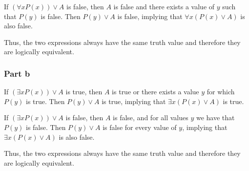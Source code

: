 \documentclass[12pt]{article}
\begin{document}
If $(\forall x P(x)) \lor A$ is false, then $A$ is false and there exists a value 
of $y$ such that $P(y)$ is false. Then $P(y) \lor A$ is false, implying that
$\forall x (P(x) \lor A)$ is also false.

Thus, the two expressions always have the same truth value and therefore they are 
logically equivalent.

\subsubsection*{Part b}

If $(\exists x P(x)) \lor A$ is true, then $A$ is true or there exists a value $y$ 
for which $P(y)$ is true. Then $P(y) \lor A$ is true, implying that
$\exists x (P(x) \lor A)$ is true.

If $(\exists x P(x)) \lor A$ is false, then $A$ is false, and for all values $y$ 
we have that $P(y)$ is false. Then $P(y) \lor A$ is false for every value of $y$, 
implying that $\exists x (P(x) \lor A)$ is also false.

Thus, the two expressions always have the same truth value and therefore they are 
logically equivalent.
\end{document}
